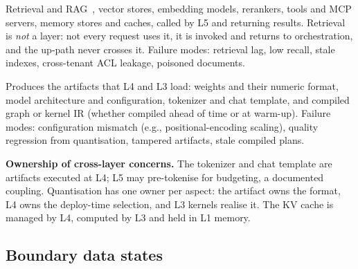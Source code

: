 \documentclass[11pt]{article}
\begin{document}
\begin{description}[leftmargin=0.6cm, itemsep=3pt, style=unboxed]
\item[Context Services plane.] Retrieval and RAG~\cite{lewis2020rag}, vector stores, embedding models, rerankers, tools and MCP servers, memory stores and caches, called by L5 and returning results. Retrieval is \emph{not} a layer: not every request uses it, it is invoked and returns to orchestration, and the up-path never crosses it. Failure modes: retrieval lag, low recall, stale indexes, cross-tenant ACL leakage, poisoned documents.
\item[Build/Deploy plane.] Produces the artifacts that L4 and L3 load: weights and their numeric format, model architecture and configuration, tokenizer and chat template, and compiled graph or kernel IR (whether compiled ahead of time or at warm-up). Failure modes: configuration mismatch (e.g., positional-encoding scaling), quality regression from quantisation, tampered artifacts, stale compiled plans.
\end{description}

\noindent\textbf{Ownership of cross-layer concerns.} The tokenizer and chat template are artifacts executed at L4; L5 may pre-tokenise for budgeting, a documented coupling. Quantisation has one owner per aspect: the artifact owns the format, L4 owns the deploy-time selection, and L3 kernels realise it. The KV cache is managed by L4, computed by L3 and held in L1 memory.

\subsection{Boundary data states}
\label{sec:states}
\end{document}

